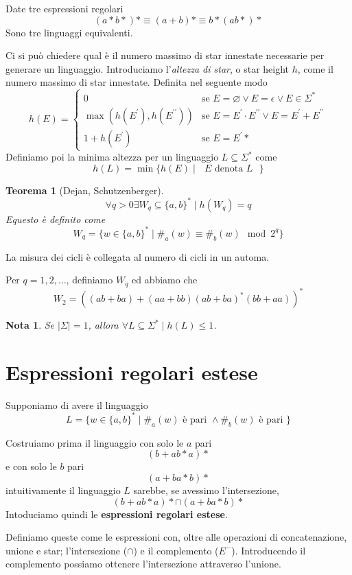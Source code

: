 \documentclass[12pt]{report}
\newtheorem{teorema}{Teorema}
\newtheorem{nota}{Nota}
\begin{document}
Date tre espressioni regolari
$$ (a*b*)* \equiv (a + b)* \equiv b*(ab*)* $$
Sono tre linguaggi equivalenti.

Ci si può chiedere qual è il numero massimo di star innestate necessarie per generare un linguaggio.
Introduciamo l'\textit{altezza di star}, o star height $h$, come il numero massimo di star innestate.
Definita nel seguente modo
$$ h(E) = 
\begin{cases}
	0 & \text{se } E = \varnothing \vee E = \epsilon \vee E \in \Sigma^* \\
	\max(h(E^\prime), h(E^{\prime\prime})) & \text{se } E = E^\prime \cdot E^{\prime\prime} \vee E = E^\prime + E^{\prime\prime} \\
	1 + h(E^\prime) & \text{se } E = E^\prime*
\end{cases}
$$
Definiamo poi la minima altezza per un linguaggio $L \subseteq \Sigma^*$ come
$$ h(L) = \min \{ h(E) \mid \text{ $E$ denota $L$ } \} $$

\begin{teorema}[Dejan, Schutzenberger]
	$$\forall q > 0 \exists W_q \subseteq \{a, b\}^* \mid h(W_q) = q $$
	Equesto è definito come
	$$ W_q = \{ w \in \{a, b\}^* \mid \#_a(w) \equiv \#_b(w) \mod 2^q \} $$
\end{teorema}

La misura dei cicli è collegata al numero di cicli in un automa.
\begin{tcolorbox}
	Per $q = 1, 2, \dots$, definiamo $W_q$ ed abbiamo che
	$$ W_2 = ((ab + ba) + (aa + bb)(ab + ba)^*(bb + aa))^* $$
\end{tcolorbox}

\begin{nota}
	Se $|\Sigma| = 1$, allora $\forall L \subseteq \Sigma^* \mid h(L) \leq 1$.
\end{nota}

\section{Espressioni regolari estese}
Supponiamo di avere il linguaggio
$$ L = \{ w \in \{a, b\}^* \mid \#_a(w) \text{ è pari } \wedge \#_b(w) \text{ è pari } \} $$

Costruiamo prima il linguaggio con solo le $a$ pari
$$ (b + ab*a)* $$
e con solo le $b$ pari
$$ (a + ba*b)* $$
intuitivamente il linguaggio $L$ sarebbe, se avessimo l'intersezione, 
$$ (b + ab*a)* \cap (a + ba*b)* $$
Intoduciamo quindi le \textbf{espressioni regolari estese}.

Definiamo queste come le espressioni con, oltre alle operazioni di concatenazione, unione e star; l'intersezione ($\cap$) e il complemento ($E^-$).
Introducendo il complemento possiamo ottenere l'intersezione attraverso l'unione.
\end{document}
